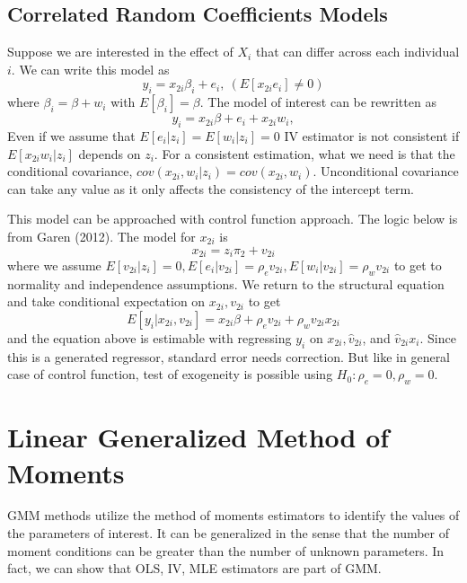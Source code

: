 \documentclass[12pt]{article}
\theoremstyle{definition}
\theoremstyle{property}
\theoremstyle{assumption}
\theoremstyle{example}
\theoremstyle{comment}
\begin{document}
\subsection{Correlated Random Coefficients Models}
Suppose we are interested in the effect of $X_i$ that can differ across each individual $i$. We can write this model as
\[
y_i = x_{2i}\beta_i+e_i, \ (E[x_{2i}e_i]\neq0)
\]
where $\beta_i=\beta+w_i$ with $E[\beta_i]=\beta$. The model of interest can be rewritten as
\[
y_i = x_{2i}\beta+e_i+x_{2i}w_i, 
\]
Even if we assume that $E[e_i|z_i]=E[w_i|z_i]=0$ IV estimator is not consistent if $E[x_{2i}w_i|z_i]$ depends on $z_i$. For a consistent estimation, what we need is that the conditional covariance, $cov(x_{2i},w_i|z_i)=cov(x_{2i},w_i)$. Unconditional covariance can take any value as it only affects the consistency of the intercept term.
\par
This model can be approached with control function approach. The logic below is from Garen (2012). The model for $x_{2i}$ is 
\[
x_{2i}=z_i\pi_2+v_{2i}
\]
where we assume $E[v_{2i}|z_i]=0, E[e_i|v_{2i}]=\rho_ev_{2i}, E[w_i|v_{2i}]=\rho_wv_{2i}$ to get to normality and independence assumptions. We return to the structural equation and take conditional expectation on $x_{2i}, v_{2i}$ to get
\[
E[y_i|x_{2i}, v_{2i}]= x_{2i}\beta+\rho_ev_{2i}+\rho_wv_{2i}x_{2i}
\]
and the equation above is estimable with regressing $y_i$ on $x_{2i}, \hat{v}_{2i}$, and $\hat{v}_{2i}x_i$. Since this is a generated regressor, standard error needs correction. But like in general case of control function, test of exogeneity is possible using $H_0:\rho_e=0, \rho_w=0$.  
\section{Linear Generalized Method of Moments}
GMM methods utilize the method of moments estimators to identify the values of the parameters of interest. It can be generalized in the sense that the number of moment conditions can be greater than the number of unknown parameters. In fact, we can show that OLS, IV, MLE estimators are part of GMM. 
\end{document}
